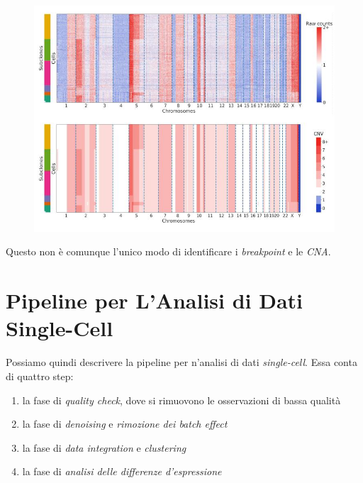 \documentclass[a4paper,12pt, oneside]{book}
\begin{document}
\begin{figure}[H]
  \centering
  \includegraphics[scale = 0.45]{img/cna7.jpg}
\end{figure}
\noindent
Questo non è comunque l'unico modo di identificare i \textit{breakpoint} e le
\textit{CNA}.
\section{Pipeline per L'Analisi di Dati Single-Cell}
Possiamo quindi descrivere la pipeline per n'analisi di dati
\textit{single-cell}. Essa conta di quattro step:
\begin{enumerate}
  \item la fase di \textit{quality check}, dove si rimuovono le osservazioni di
  bassa qualità
  \item la fase di \textit{denoising} e \textit{rimozione dei batch effect}
  \item la fase di \textit{data integration} e \textit{clustering}
  \item la fase di \textit{analisi delle differenze d'espressione}
\end{enumerate}
\end{document}

